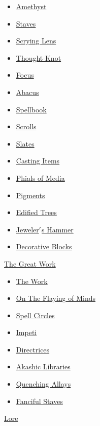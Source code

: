 \documentclass[12pt]{article}
\begin{document}
    \begin{itemize}
        \item\hyperref[ sec:items/amethyst ]{ Amethyst}
        \item\hyperref[ sec:items/staff ]{ Staves}
        \item\hyperref[ sec:items/lens ]{ Scrying Lens}
        \item\hyperref[ sec:items/thought_knot ]{ Thought-Knot}
        \item\hyperref[ sec:items/focus ]{ Focus}
        \item\hyperref[ sec:items/abacus ]{ Abacus}
        \item\hyperref[ sec:items/spellbook ]{ Spellbook}
        \item\hyperref[ sec:items/scroll ]{ Scrolls}
        \item\hyperref[ sec:items/slate ]{ Slates}
        \item\hyperref[ sec:items/hexcasting ]{ Casting Items}
        \item\hyperref[ sec:items/phials ]{ Phials of Media}
        \item\hyperref[ sec:items/pigments ]{ Pigments}
        \item\hyperref[ sec:items/edified ]{ Edified Trees}
        \item\hyperref[ sec:items/jeweler_hammer ]{ Jeweler$\rq$s Hammer}
        \item\hyperref[ sec:items/decoration ]{ Decorative Blocks}
    \end{itemize}
    \hyperref[ sec:greatwork ]{ The Great Work}

    \begin{itemize}
        \item\hyperref[ sec:greatwork/the_work ]{ The Work}
        \item\hyperref[ sec:greatwork/brainsweeping ]{ On The Flaying of Minds}
        \item\hyperref[ sec:greatwork/spellcircles ]{ Spell Circles}
        \item\hyperref[ sec:greatwork/impetus ]{ Impeti}
        \item\hyperref[ sec:greatwork/directrix ]{ Directrices}
        \item\hyperref[ sec:greatwork/akashiclib ]{ Akashic Libraries}
        \item\hyperref[ sec:greatwork/quenching_allays ]{ Quenching Allays}
        \item\hyperref[ sec:greatwork/fanciful_staves ]{ Fanciful Staves}
    \end{itemize}
    \hyperref[ sec:lore ]{ Lore}
\end{document}
